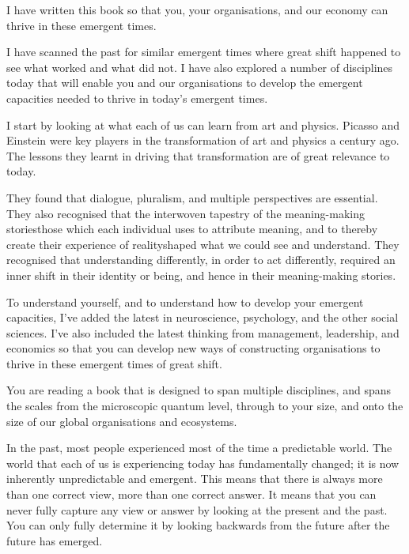 I have written this book so that you, your organisations, and our economy can thrive in these emergent times. 


I have scanned the past for similar emergent times where great shift  happened to see what worked and what did not. I have also explored a number of disciplines today that will enable you and our organisations to develop the emergent capacities needed to thrive in today's emergent times.


I start by looking at what each of us can learn from art and physics. Picasso and Einstein were key players in the transformation of art and physics a century ago. The lessons they learnt in driving that transformation are of great relevance to today. 


They found that dialogue, pluralism, and multiple perspectives are essential. They also recognised that the interwoven tapestry of the meaning\hyp{}making stories\textemdash those which each individual uses to attribute meaning, and to thereby create their experience of reality\textemdash shaped what we could see and understand. They recognised that understanding differently, in order to act differently, required an inner shift in their identity or being, and hence in their meaning\hyp{}making stories.


To understand yourself, and to understand how to develop your emergent capacities, I've added the latest in neuroscience, psychology,  and the other social sciences. I've also included the latest thinking from management, leadership, and economics so that you can develop new ways of constructing organisations to thrive in these emergent times of great shift. 


You are reading a book that is designed to span multiple disciplines, and spans the scales from the microscopic quantum level, through to your size, and onto the size of our global organisations and ecosystems.


In the past, most people experienced most of the time a predictable world. The world that each of us is experiencing today has fundamentally changed; it is now inherently unpredictable and emergent. This means that there is always more than one correct view, more than one correct answer. It means that you can never fully capture any view or answer by looking at the present and the past. You can only fully determine it by looking backwards from the future after the future has emerged.


